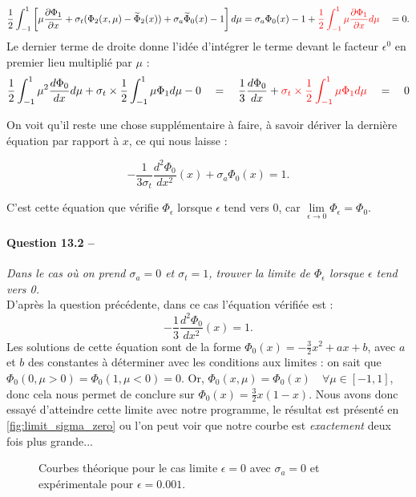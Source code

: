 \documentclass[11pt,a4paper]{article}
\newcommand{\dx}[1]{\dfrac{\partial #1}{\partial x}}
\newcommand{\question}[2]{\paragraph{Question #1 --}\hspace{-7pt}\textit{#2} \\}
\newcommand{\Phit}{\widetilde{\Phi}}
\begin{document}
\begin{equation}
 \frac{1}{2}\int_{-1}^1 \left[ \mu \dx{\Phi_1} + \sigma_t (\Phi_2(x,\mu) - \Phit_2(x)) + \sigma_a \Phit_0(x) -1 \right] d\mu
 = \sigma_a \Phi_0(x) -1 + \textcolor{red}{\frac{1}{2}\int_{-1}^1  \mu \dx{\Phi_1} d\mu} \quad = 0.
\end{equation}
Le dernier terme de droite donne l'idée d'intégrer le terme devant le facteur $\epsilon^0$ en premier lieu multiplié par $\mu$ :
\begin{equation}
 \frac{1}{2} \int_{-1}^1 \mu^2 \frac{d\Phi_0}{dx} d\mu + \sigma_t \times \frac{1}{2}\int_{-1}^1  \mu \Phi_1 d\mu - 0
 \quad = \quad \frac{1}{3} \frac{d\Phi_0}{dx} + \textcolor{red}{\sigma_t \times \frac{1}{2}\int_{-1}^1  \mu \Phi_1 d\mu}
 \quad = \quad 0
\end{equation}

On voit qu'il reste une chose supplémentaire à faire, à savoir dériver la dernière équation par rapport à $x$, ce qui nous laisse :

\begin{equation}
- \frac{1}{3 \sigma_t} \frac{d^2 \Phi_0}{d x^2}(x) + \sigma_a\Phi_0(x) = 1 .
\end{equation}

C'est cette équation que vérifie $\Phi_\epsilon$ lorsque $\epsilon$ tend vers 0, car $\lim\limits_{\epsilon \rightarrow 0} \Phi_\epsilon = \Phi_0$.

\question{13.2}{Dans le cas où on prend $\sigma_a = 0$ et $\sigma_t = 1$, trouver la limite de $\Phi_\epsilon$ lorsque $\epsilon$ tend vers 0.}

D'après la question précédente, dans ce cas l'équation vérifiée est :
\begin{equation}
- \frac{1}{3} \frac{d^2 \Phi_0}{d x^2}(x) = 1 .
\end{equation}
Les solutions de cette équation sont de la forme $\Phi_0(x) = -\frac{3}{2}x^2 + a x +b$, avec $a$ et $b$ des constantes à déterminer avec les conditions aux limites : on sait que $\Phi_0(0,\mu >0) = \Phi_0(1,\mu <0) = 0$.
Or, $\Phi_0(x,\mu) = \Phi_0(x) \quad \forall \mu \in [-1,1]$, donc cela nous permet de conclure sur $\Phi_0(x) = \frac{3}{2}x(1-x)$. Nous avons donc essayé d'atteindre cette limite avec notre programme, le résultat est présenté en \autoref{fig:limit_sigma_zero} ou l'on peut voir que notre courbe est \emph{exactement} deux fois plus grande...

\begin{figure}
  \centering
  
  \caption{Courbes théorique pour le cas limite $\epsilon=0$ avec $\sigma_a=0$ et expérimentale pour $\epsilon=0.001$.}
  \label{fig:limit_sigma_zero}
\end{figure}
\end{document}
